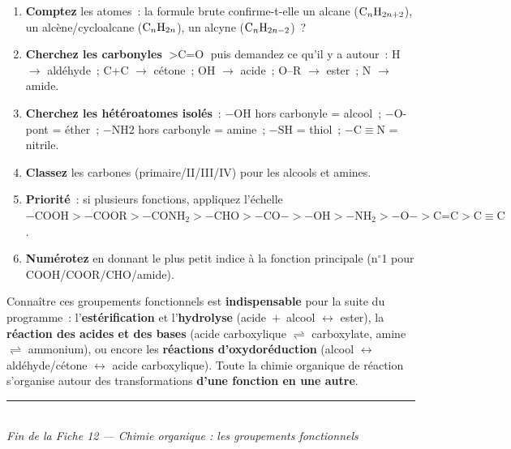 \documentclass[11pt,a4paper]{article}
\begin{document}
\begin{methode}
\hfill
\begin{enumerate}[leftmargin=1.6em,itemsep=1pt]
  \item \textbf{Comptez} les atomes~: la formule brute confirme-t-elle un alcane ($\ce{C_nH_{2n+2}}$), un alcène/cycloalcane ($\ce{C_nH_{2n}}$), un alcyne ($\ce{C_nH_{2n-2}}$)~?
  \item \textbf{Cherchez les carbonyles} $>\text{C=O}$ puis demandez ce qu'il y a autour~: H $\rightarrow$ aldéhyde~; C+C $\rightarrow$ cétone~; OH $\rightarrow$ acide~; O--R $\rightarrow$ ester~; N $\rightarrow$ amide.
  \item \textbf{Cherchez les hétéroatomes isolés}~: $-\text{OH}$ hors carbonyle = alcool~; $-\text{O-}$ pont = éther~; $-\text{NH2}$ hors carbonyle = amine~; $-\text{SH}$ = thiol~; $-\text{C}\equiv\text{N}$ = nitrile.
  \item \textbf{Classez} les carbones (primaire/II/III/IV) pour les alcools et amines.
  \item \textbf{Priorité}~: si plusieurs fonctions, appliquez l'échelle $-\text{COOH} > -\text{COOR} > -\text{CONH}_2 > -\text{CHO} > -\text{CO}- > -\text{OH} > -\text{NH}_2 > -\text{O}- > \text{C=C} > \text{C}\equiv\text{C}$.
  \item \textbf{Numérotez} en donnant le plus petit indice à la fonction principale (n$^\circ$1 pour COOH/COOR/CHO/amide).
\end{enumerate}
\end{methode}

\begin{remarque}
Connaître ces groupements fonctionnels est \textbf{indispensable} pour la suite du programme~: l'\textbf{estérification} et l'\textbf{hydrolyse} (acide~$+$~alcool $\leftrightarrow$ ester), la \textbf{réaction des acides et des bases} (acide carboxylique $\rightleftharpoons$ carboxylate, amine $\rightleftharpoons$ ammonium), ou encore les \textbf{réactions d'oxydoréduction} (alcool $\leftrightarrow$ aldéhyde/cétone $\leftrightarrow$ acide carboxylique). Toute la chimie organique de réaction s'organise autour des transformations \textbf{d'une fonction en une autre}.
\end{remarque}

\vfill
\begin{center}
\small\color{primarydark}\rule{0.5\textwidth}{0.4pt}\\[2pt]
\textit{Fin de la Fiche 12 — Chimie organique : les groupements fonctionnels}
\end{center}
\end{document}

